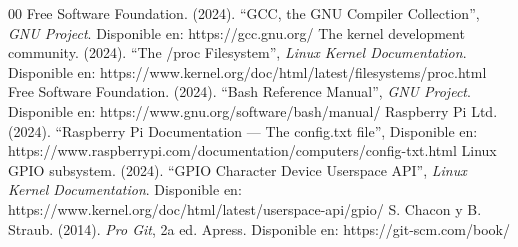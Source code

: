 \documentclass[conference]{IEEEtran}
\begin{document}
\begin{thebibliography}{00}
	 Free Software Foundation. (2024). ``GCC, the GNU Compiler Collection'', \textit{GNU Project}. Disponible en: https://gcc.gnu.org/
	 The kernel development community. (2024). ``The /proc Filesystem'', \textit{Linux Kernel Documentation}. Disponible en: https://www.kernel.org/doc/html/latest/filesystems/proc.html
	 Free Software Foundation. (2024). ``Bash Reference Manual'', \textit{GNU Project}. Disponible en: https://www.gnu.org/software/bash/manual/
	 Raspberry Pi Ltd. (2024). ``Raspberry Pi Documentation --- The config.txt file'', Disponible en: https://www.raspberrypi.com/documentation/computers/config-txt.html
	 Linux GPIO subsystem. (2024). ``GPIO Character Device Userspace API'', \textit{Linux Kernel Documentation}. Disponible en: https://www.kernel.org/doc/html/latest/userspace-api/gpio/
	 S. Chacon y B. Straub. (2014). \textit{Pro Git}, 2a ed. Apress. Disponible en: https://git-scm.com/book/
\end{thebibliography}
\end{document}
